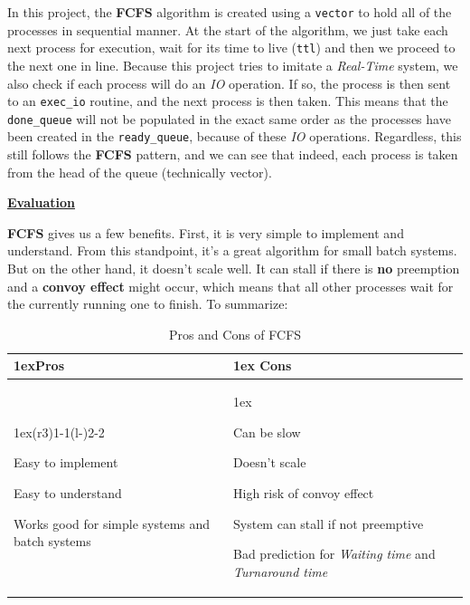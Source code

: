 \documentclass{article}
\newcommand{\code}[1]{\colorbox{codebg}{{\color{black}\texttt{#1}}}}
\begin{document}
In this project, the \textbf{FCFS} algorithm is created using a \code{vector} to hold all of the processes in sequential manner. At the start of the algorithm, we just take each next process for execution, wait for its time to live (\code{ttl}) and then we proceed to the next one in line. Because this project tries to imitate a \textit{Real-Time} system, we also check if each process will do an \textit{IO} operation. If so, the process is then sent to an \code{exec\_io} routine, and the next process is then taken. This means that the \code{done\_queue} will not be populated in the exact same order as the processes have been created in the \code{ready\_queue}, because of these \textit{IO} operations. Regardless, this still follows the \textbf{FCFS} pattern, and we can see that indeed, each process is taken from the head of the queue (technically vector).

\underline{\textbf{Evaluation}}

\textbf{FCFS} gives us a few benefits. First, it is very simple to implement and understand. From this standpoint, it's a great algorithm for small batch systems. But on the other hand, it doesn't scale well. It can stall if there is \textbf{no} preemption and a \textbf{convoy effect} might occur, which means that all other processes wait for the currently running one to finish. To summarize:

\begin{table}[H]
  \begin{tabularx}{\linewidth}{>{\parskip1ex}X@{\kern4\tabcolsep}>{\parskip1ex}X}
    \toprule
    \hfil\bfseries Pros & \hfil\bfseries Cons \\
    \cmidrule(r{3\tabcolsep}){1-1}\cmidrule(l{-\tabcolsep}){2-2}

    Easy to implement\par
    Easy to understand\par
    Works good for simple systems and batch systems\par

    &

    Can be slow\par
    Doesn't scale\par
    High risk of convoy effect\par
    System can stall if not preemptive\par
    Bad prediction for \textit{Waiting time} and \textit{Turnaround time} \\
    \bottomrule
  \end{tabularx}
  \caption{Pros and Cons of FCFS}
\end{table}
\end{document}
